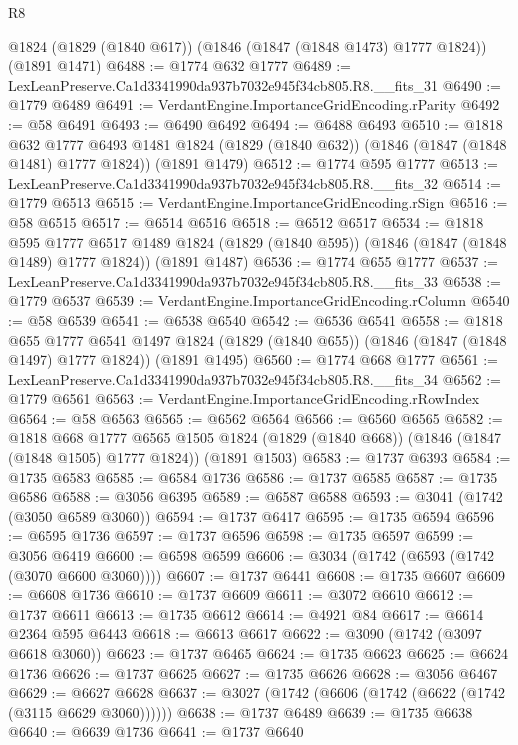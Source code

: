 \begin{lexlean}{R8}
\begin{coremodule}
    @1824
    (@1829 (@1840 @617))
    (@1846 (@1847 (@1848 @1473) @1777 @1824))
    (@1891 @1471)
@6488 := @1774 @632 @1777
@6489 := LexLeanPreserve.Ca1d3341990da937b7032e945f34cb805.R8.__fits_31
@6490 := @1779 @6489
@6491 := VerdantEngine.ImportanceGridEncoding.rParity
@6492 := @58 @6491
@6493 := @6490 @6492
@6494 := @6488 @6493
@6510 := @1818
    @632
    @1777
    @6493
    @1481
    @1824
    (@1829 (@1840 @632))
    (@1846 (@1847 (@1848 @1481) @1777 @1824))
    (@1891 @1479)
@6512 := @1774 @595 @1777
@6513 := LexLeanPreserve.Ca1d3341990da937b7032e945f34cb805.R8.__fits_32
@6514 := @1779 @6513
@6515 := VerdantEngine.ImportanceGridEncoding.rSign
@6516 := @58 @6515
@6517 := @6514 @6516
@6518 := @6512 @6517
@6534 := @1818
    @595
    @1777
    @6517
    @1489
    @1824
    (@1829 (@1840 @595))
    (@1846 (@1847 (@1848 @1489) @1777 @1824))
    (@1891 @1487)
@6536 := @1774 @655 @1777
@6537 := LexLeanPreserve.Ca1d3341990da937b7032e945f34cb805.R8.__fits_33
@6538 := @1779 @6537
@6539 := VerdantEngine.ImportanceGridEncoding.rColumn
@6540 := @58 @6539
@6541 := @6538 @6540
@6542 := @6536 @6541
@6558 := @1818
    @655
    @1777
    @6541
    @1497
    @1824
    (@1829 (@1840 @655))
    (@1846 (@1847 (@1848 @1497) @1777 @1824))
    (@1891 @1495)
@6560 := @1774 @668 @1777
@6561 := LexLeanPreserve.Ca1d3341990da937b7032e945f34cb805.R8.__fits_34
@6562 := @1779 @6561
@6563 := VerdantEngine.ImportanceGridEncoding.rRowIndex
@6564 := @58 @6563
@6565 := @6562 @6564
@6566 := @6560 @6565
@6582 := @1818
    @668
    @1777
    @6565
    @1505
    @1824
    (@1829 (@1840 @668))
    (@1846 (@1847 (@1848 @1505) @1777 @1824))
    (@1891 @1503)
@6583 := @1737 @6393
@6584 := @1735 @6583
@6585 := @6584 @1736
@6586 := @1737 @6585
@6587 := @1735 @6586
@6588 := @3056 @6395
@6589 := @6587 @6588
@6593 := @3041 (@1742 (@3050 @6589 @3060))
@6594 := @1737 @6417
@6595 := @1735 @6594
@6596 := @6595 @1736
@6597 := @1737 @6596
@6598 := @1735 @6597
@6599 := @3056 @6419
@6600 := @6598 @6599
@6606 := @3034 (@1742 (@6593 (@1742 (@3070 @6600 @3060))))
@6607 := @1737 @6441
@6608 := @1735 @6607
@6609 := @6608 @1736
@6610 := @1737 @6609
@6611 := @3072 @6610
@6612 := @1737 @6611
@6613 := @1735 @6612
@6614 := @4921 @84
@6617 := @6614 @2364 @595 @6443
@6618 := @6613 @6617
@6622 := @3090 (@1742 (@3097 @6618 @3060))
@6623 := @1737 @6465
@6624 := @1735 @6623
@6625 := @6624 @1736
@6626 := @1737 @6625
@6627 := @1735 @6626
@6628 := @3056 @6467
@6629 := @6627 @6628
@6637 := @3027 (@1742 (@6606 (@1742 (@6622 (@1742 (@3115 @6629 @3060))))))
@6638 := @1737 @6489
@6639 := @1735 @6638
@6640 := @6639 @1736
@6641 := @1737 @6640

\end{coremodule}
\end{lexlean}
